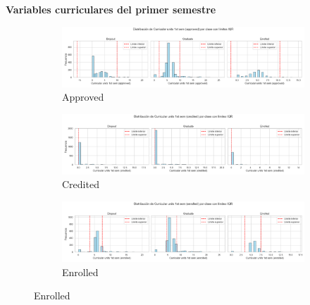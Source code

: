 \documentclass{report}[14pt]
\begin{document}
\textbf{Variables curriculares del primer semestre} \\
\begin{figure}[htbp]
  \centering
  \begin{subfigure}[b]{.32\linewidth}
    \includegraphics[width=\linewidth]{distribution/Curricular units 1st sem (approved)_distribution.png}
    \caption{Approved}\label{fig:approved1}
  \end{subfigure}\hfill
  \begin{subfigure}[b]{.32\linewidth}
    \includegraphics[width=\linewidth]{distribution/Curricular units 1st sem (credited)_distribution.png}
    \caption{Credited}\label{fig:credited1}
  \end{subfigure}\hfill
  \begin{subfigure}[b]{.32\linewidth}
    \includegraphics[width=\linewidth]{distribution/Curricular units 1st sem (enrolled)_distribution.png}
    \caption{Enrolled}\label{fig:enrolled1}
  \end{subfigure}

  \medskip  %


\end{figure}
\end{document}

